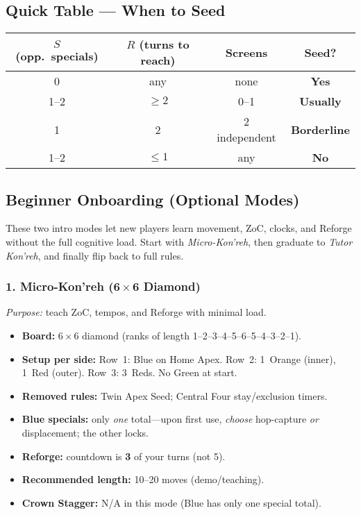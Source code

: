 \documentclass[11pt]{article}
\begin{document}
\bigskip

\subsection*{Quick Table — When to Seed}
\begin{center}
\begin{tabular}{|c|c|c|c|}
\hline
$S$ (opp.\ specials) & $R$ (turns to reach) & Screens & Seed? \\
\hline
0 & any & none & \textbf{Yes} \\
\hline
1–2 & $\ge 2$ & 0–1 & \textbf{Usually} \\
\hline
1 & 2 & 2 independent & \textbf{Borderline} \\
\hline
1–2 & $\le 1$ & any & \textbf{No} \\
\hline
\end{tabular}
\end{center}

\clearpage
\subsection{Beginner Onboarding (Optional Modes)}
\label{sec:onboarding}

\noindent These two intro modes let new players learn movement, ZoC, clocks, and Reforge without the full cognitive load. Start with \emph{Micro-Kon'reh}, then graduate to \emph{Tutor Kon'reh}, and finally flip back to full rules.

\subsubsection*{1. Micro-Kon'reh (6\,$\times$\,6 Diamond)}
\textit{Purpose:} teach ZoC, tempos, and Reforge with minimal load.
\begin{itemize}[leftmargin=1.3em]
  \item \textbf{Board:} 6\,$\times$\,6 diamond (ranks of length 1–2–3–4–5–6–5–4–3–2–1).
  \item \textbf{Setup per side:} Row~1: Blue on Home Apex. Row~2: 1~Orange (inner), 1~Red (outer). Row~3: 3~Reds. No Green at start.
  \item \textbf{Removed rules:} Twin Apex Seed; Central Four stay/exclusion timers.
  \item \textbf{Blue specials:} only \emph{one} total—upon first use, \emph{choose} hop-capture \emph{or} displacement; the other locks.
  \item \textbf{Reforge:} countdown is \textbf{3} of your turns (not 5).
  \item \textbf{Recommended length:} 10–20 moves (demo/teaching).
  \item \textbf{Crown Stagger:} \textsc{N/A} in this mode (Blue has only one special total).
\end{itemize}
\end{document}
